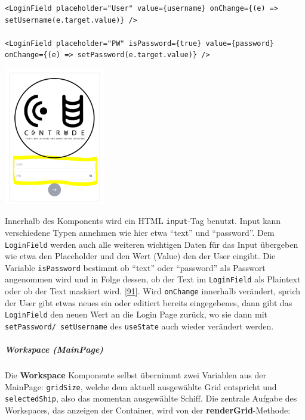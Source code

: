 \documentclass[
    headings=optiontotocandhead,%
    twoside,
    numbers=noenddot,%
    12pt, %
    titlepage, %
    parskip=full, %
    listof=leveldown, 
    numbers=noenddot, %
    a4paper,DIV=14,
    BCOR=15mm,
]{scrbook}
\newcommand{\passthrough}[1]{#1}
\let\origfigure=\figure
\let\endorigfigure=\endfigure
\renewenvironment{figure}[1][]{%
   \origfigure[H]
}{%
   \endorigfigure
}
\begin{document}
\begin{lstlisting}[caption={Nutzung der LoginField Komponente}]
<LoginField placeholder="User" value={username} onChange={(e) => setUsername(e.target.value)} />

<LoginField placeholder="PW" isPassword={true} value={password} onChange={(e) => setPassword(e.target.value)} />
\end{lstlisting}

\begin{figure}
\centering
\includegraphics[width=0.33\textwidth,height=\textheight]{img/Gekle/Loginfields.png}
\caption{LoginFields (Gelb markiert)}
\end{figure}

Innerhalb des Komponents wird ein HTML
\passthrough{\lstinline!input!}-Tag benutzt. Input kann verschiedene
Typen annehmen wie hier etwa ``text'' und ``password''. Dem
\passthrough{\lstinline!LoginField!} werden auch alle weiteren wichtigen
Daten für das Input übergeben wie etwa den Placeholder und den Wert
(Value) den der User eingibt. Die Variable
\passthrough{\lstinline!isPassword!} bestimmt ob ``text'' oder
``password'' als Passwort angenommen wird und in Folge dessen, ob der
Text im \passthrough{\lstinline!LoginField!} als Plaintext oder ob der
Text maskiert wird.
{[}\protect\hyperlink{ref-GeeksForGeeks-HTMLInputTag}{91}{]}. Wird
\passthrough{\lstinline!onChange!} innerhalb verändert, sprich der User
gibt etwas neues ein oder editiert bereits eingegebenes, dann gibt das
\passthrough{\lstinline!LoginField!} den neuen Wert an die Login Page
zurück, wo sie dann mit
\passthrough{\lstinline!setPassword/ setUsername!} des
\passthrough{\lstinline!useState!} auch wieder verändert werden.

\hypertarget{workspace-mainpage}{%
\subparagraph{Workspace (MainPage)}\label{workspace-mainpage}}

Die \textbf{Workspace} Komponente selbst übernimmt zwei Variablen aus
der MainPage: \passthrough{\lstinline!gridSize!}, welche dem aktuell
ausgewählte Grid entspricht und \passthrough{\lstinline!selectedShip!},
also das momentan ausgewählte Schiff. Die zentrale Aufgabe des
Workspaces, das anzeigen der Container, wird von der
\textbf{renderGrid}-Methode:
\end{document}
